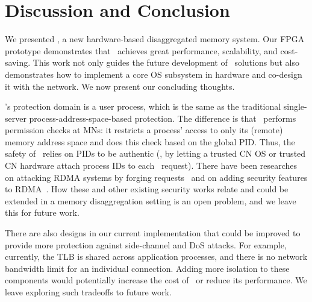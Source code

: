 \section{Discussion and Conclusion}
\label{sec:discussion}

We presented \sys, a new hardware-based disaggregated memory system.
Our FPGA prototype demonstrates that \sys\ achieves great performance, scalability, and cost-saving.
This work not only guides the future development of \md\ solutions
but also demonstrates how to implement a core OS subsystem in hardware and co-design it with the network.
We now present our concluding thoughts.



\sys’s protection domain is a user process, which is the same as the traditional single-server process-address-space-based protection. The difference is that \sys\ performs permission checks at MNs: it restricts a process’ access to only its (remote) memory address space and does this check based on the global PID. Thus, the safety of \sys\ relies on PIDs to be authentic (\eg, by letting a trusted CN OS or trusted CN hardware attach process IDs to each \sys\ request). There have been researches on attacking RDMA systems by forging requests~\cite{ReDMArk-security21} and on adding security features to RDMA~\cite{1RMA,sRDMA-ATC20}. How these and other existing security works relate and could be extended in a memory disaggregation setting is an open problem, and we leave this for future work.

There are also designs in our current implementation that could be improved to provide more protection against side-channel and DoS attacks.
For example, currently, the TLB is shared across application processes,
and there is no network bandwidth limit for an individual connection.
Adding more isolation to these components would potentially increase the cost of \sysboard\ or reduce its performance.
We leave exploring such tradeoffs to future work.

